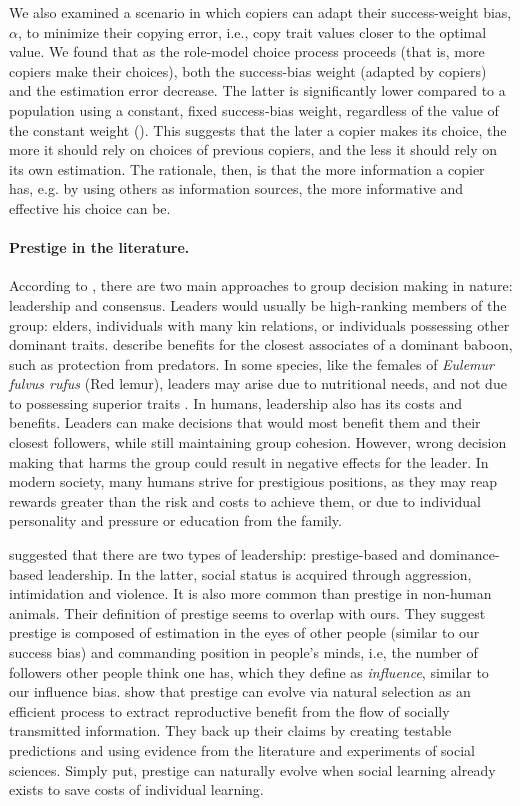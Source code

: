 \documentclass[12pt]{extarticle}
\begin{document}
We also examined a scenario in which copiers can adapt their success-weight bias, $\alpha$, to minimize their copying error, i.e., copy trait values closer to the optimal value.
We found that as the role-model choice process proceeds (that is, more copiers make their choices), both the success-bias weight (adapted by copiers) and the estimation error decrease. 
The latter is significantly lower compared to a population using a constant, fixed success-bias weight, regardless of the value of the constant weight ().
This suggests that the later a copier makes its choice, the more it should rely on choices of previous copiers, and the less it should rely on its own estimation.
The rationale, then, is that the more information a copier has, e.g. by using others as information sources, the more informative and effective his choice can be.

\paragraph{Prestige in the literature.}

According to \citet{animal_leadership}, there are two main approaches to group decision making in nature: leadership and consensus.
Leaders would usually be high-ranking members of the group: elders, individuals with many kin relations, or individuals possessing other dominant traits.
\citet{animal_leadership} describe benefits for the closest associates of a dominant baboon, such as protection from predators. 
In some species, like the females of \emph{Eulemur fulvus rufus} (Red lemur), leaders may arise due to nutritional needs, and not due to possessing superior traits \citep{lemurs}. 
In humans, leadership also has its costs and benefits. Leaders can make decisions that would most benefit them and their closest followers, while still maintaining group cohesion. 
However, wrong decision making that harms the group could result in negative effects for the leader. 
In modern society, many humans strive for prestigious positions, as they may reap rewards greater than the risk and costs to achieve them, or due to individual personality and pressure or education from the family. 

\citet{prestige_evolution} suggested that there are two types of leadership: prestige-based and dominance-based leadership.
In the latter, social status is acquired through aggression, intimidation and violence. It is also more common than prestige in non-human animals.
Their definition of prestige seems to overlap with ours. They suggest prestige is composed of estimation in the eyes of other people (similar to our success bias) and commanding position in people's minds, i.e, the number of followers other people think one has, which they define as \emph{influence}, similar to our influence bias.
\citet{prestige_evolution} show that prestige can evolve via natural selection as an efficient process to extract reproductive benefit from the flow of socially transmitted information. They back up their claims by creating testable predictions and using evidence from the literature and experiments of social sciences.
Simply put, prestige can naturally evolve when social learning already exists to save costs of individual learning. 
\end{document}
